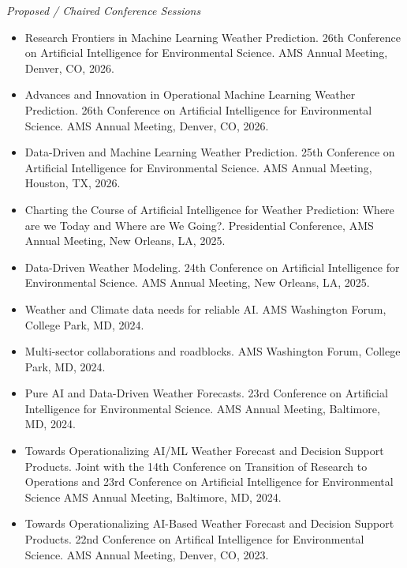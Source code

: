 \documentclass[11pt,letterpaper]{article}
\begin{document}
\bigskip
\emph{Proposed / Chaired Conference Sessions}
\medskip
\begin{itemize}[itemindent=-10pt]

 \item Research Frontiers in Machine Learning Weather Prediction. 26th Conference on Artificial Intelligence for Environmental Science. AMS Annual Meeting, Denver, CO, 2026.

 \item Advances and Innovation in Operational Machine Learning Weather Prediction. 26th Conference on Artificial Intelligence for Environmental Science. AMS Annual Meeting, Denver, CO, 2026.

 \item Data-Driven and Machine Learning Weather Prediction. 25th Conference on Artificial Intelligence for Environmental Science. AMS Annual Meeting, Houston, TX, 2026.

 \item Charting the Course of Artificial Intelligence for Weather Prediction: Where are we Today and Where are We Going?. Presidential Conference, AMS Annual Meeting, New Orleans, LA, 2025.

 \item Data-Driven Weather Modeling. 24th Conference on Artificial Intelligence for Environmental Science. AMS Annual Meeting, New Orleans, LA, 2025.

 \item Weather and Climate data needs for reliable AI. AMS Washington Forum, College Park, MD, 2024.
 
 \item Multi-sector collaborations and roadblocks. AMS Washington Forum, College Park, MD, 2024.

 \item Pure AI and Data-Driven Weather Forecasts. 23rd Conference on Artificial Intelligence for Environmental Science. AMS Annual Meeting, Baltimore, MD, 2024.

 \item Towards Operationalizing AI/ML Weather Forecast and Decision Support Products. Joint with the 14th Conference on Transition of Research to Operations and 23rd Conference on Artificial Intelligence for Environmental Science AMS Annual Meeting, Baltimore, MD, 2024.

 \item Towards Operationalizing AI-Based Weather Forecast and Decision Support Products. 22nd Conference on Artifical Intelligence for Environmental Science. AMS Annual Meeting, Denver, CO, 2023.


\end{itemize}
\end{document}
